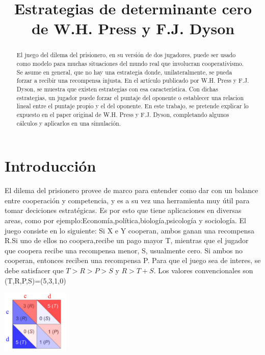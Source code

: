 \documentclass[12pt]{article}
\title{Estrategias de determinante cero de W.H. Press y F.J. Dyson}
\date{}
\begin{document}
\maketitle

\begin{abstract}
El juego del dilema del prisionero, en su versión de dos jugadores, puede ser usado como modelo para 
muchas situaciones del mundo real que involucran cooperativismo. Se asume en general, que no hay una estrategia
donde, unilateralmente, se pueda forzar a recibir una recompensa injusta.
En el artículo publicado por W.H. Press y F.J. Dyson, se muestra que existen estrategias con esa característica.
Con dichas estrategias, un jugador puede forzar el puntaje del oponente o establecer una relacion lineal entre
el puntaje propio y el del oponente.
En este trabajo, se pretende explicar lo expuesto en el paper original de W.H. Press y F.J. Dyson, completando
algunos cálculos y aplicarlos en una simulación.
\end{abstract}




\section{Introducción}
El dilema del prisionero provee de  marco para entender como dar con un balance entre cooperación y competencia, y es
a su vez una herramienta muy útil para tomar deciciones estratégicas.
Es por esto que tiene aplicaciones en diversas areas, como por ejemplo:Economía,política,biología,psicología y sociología.
El juego consiste en lo siguiente:
Si X e Y cooperan, ambos ganan una recompensa R.Si uno de ellos no coopera,recibe un pago mayor T, mientras que el
jugador que coopera recibe una recompensa menor, S, usualmente cero. Si ambos no cooperan, entonces reciben una recompensa P.
Para que el juego sea de interes, se debe satisfacer que $T >  R > P > S$ y $R > T+S$.
Los valores convencionales son (T,R,P,S)=(5,3,1,0)
\begin{center}
\includegraphics[height=3cm]{./pd.png}
\end{center}
\end{document}
